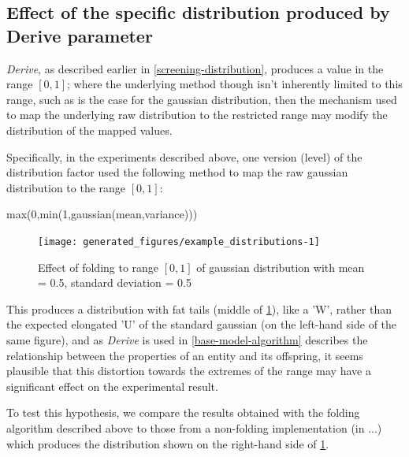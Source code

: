
\subsection{Effect of the specific distribution produced by Derive parameter}\label{alternative-distribution}

\emph{Derive}, as described earlier in \ref{screening-distribution}, produces a value in the range $[0,1]$; where the underlying method though isn't inherently limited to this range, such as is the case for the gaussian distribution, then the mechanism used to map the underlying raw distribution to the restricted range may modify the distribution of the mapped values.

Specifically, in the experiments described above, one version (level) of the distribution factor used the following method to map the raw gaussian distribution to the range $[0,1]$:

max(0,min(1,gaussian(mean,variance)))

\begin{knitrout}
\color{fgcolor}\begin{figure}[htp]
\texttt{[image: generated\_figures/example\_distributions-1]} \caption[Effect of folding to range ]{Effect of folding to range $[0,1]$ of gaussian distribution with mean = 0.5, standard deviation = 0.5}\label{fig:example_distributions}
\end{figure}


\end{knitrout}

This produces a distribution with fat tails (middle of \cref{fig:example_distributions}), like a 'W', rather than the expected elongated 'U' of the standard gaussian (on the left-hand side of the same figure), and as \emph{Derive} is used in \ref{base-model-algorithm} describes the relationship between the properties of an entity and its offspring, it seems plausible that this distortion towards the extremes of the range may have a significant effect on the experimental result.
	
To test this hypothesis, we compare the results obtained with the folding algorithm described above to those from a non-folding implementation (in ...) which produces the distribution shown on the right-hand side of \cref{fig:example_distributions}.



